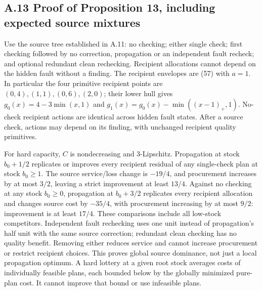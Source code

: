 \documentclass[
  11pt,
  a4paper,
]{article}
\begin{document}
\hypertarget{a.13-proof-of-proposition-13-including-expected-source-mixtures}{%
\subsection{A.13 Proof of Proposition 13, including expected source
mixtures}\label{a.13-proof-of-proposition-13-including-expected-source-mixtures}}

Use the source tree established in A.11: no checking; either single
check; first checking followed by no correction, propagation or an
independent fault recheck; and optional redundant clean rechecking.
Recipient allocations cannot depend on the hidden fault without a
finding. The recipient envelopes are (57) with \(a=1\). In particular
the four primitive recipient points are \((0,4),(1,1),(0,6),(2,0)\);
their lower hull gives \(g_0(x)=4-3\min(x,1)\) and
\(g_1(x)=g_0(x)-\min((x-1)_+,1)\). No-check recipient actions are
identical across hidden fault states. After a source check, actions may
depend on its finding, with unchanged recipient quality primitives.

For hard capacity, \(C\) is nondecreasing and 3-Lipschitz. Propagation
at stock \(b_0+1/2\) replicates or improves every recipient residual of
any single-check plan at stock \(b_0\geq1\). The source service/loss
change is \(-19/4\), and procurement increases by at most \(3/2\),
leaving a strict improvement at least \(13/4\). Against no checking at
any stock \(b_0\geq0\), propagation at \(b_0+3/2\) replicates every
recipient allocation and changes source cost by \(-35/4\), with
procurement increasing by at most \(9/2\): improvement is at least
\(17/4\). These comparisons include all low-stock competitors.
Independent fault rechecking uses one unit instead of propagation's half
unit with the same source correction; redundant clean checking has no
quality benefit. Removing either reduces service and cannot increase
procurement or restrict recipient choices. This proves global source
dominance, not just a local propagation optimum. A hard lottery at a
given root stock averages costs of individually feasible plans, each
bounded below by the globally minimized pure-plan cost. It cannot
improve that bound or use infeasible plans.
\end{document}
